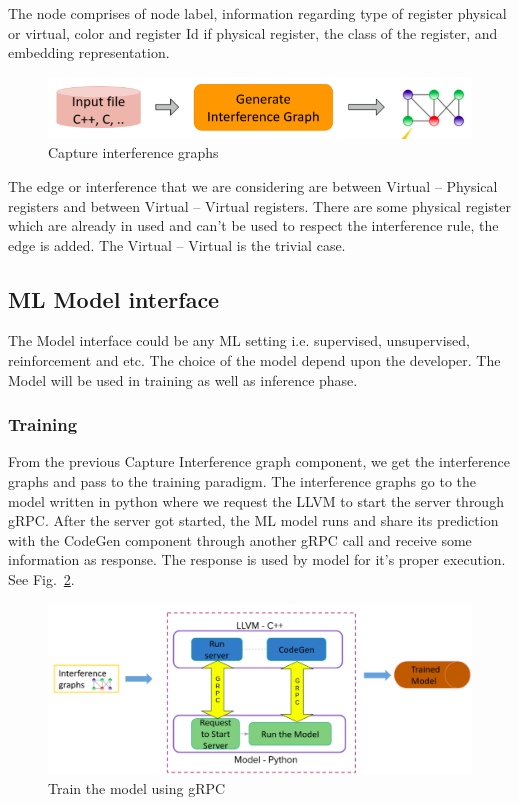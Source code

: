 The node comprises of node label, information regarding type of register physical or virtual, color and register Id if physical register, the class of the register, and embedding representation.

\begin{figure}[t]
    \centering
    \includegraphics[scale=0.4]{figures/chapter-5/mlra_cig.png}
    \caption{Capture interference graphs}
     \label{fig:mlra-cig}
\end{figure}

The edge or interference that we are considering are between Virtual -- Physical registers and between Virtual -- Virtual registers. There are some physical register which are already in used and can’t be used to respect the interference rule, the edge is added. The Virtual -- Virtual is the trivial case.
\subsection{ML Model interface}
The Model interface could be any ML setting i.e. supervised, unsupervised, reinforcement and etc. The choice of the model depend upon the developer. The Model will be used in training as well as inference phase.

\subsubsection{Training}
From the previous Capture Interference graph component, we get the interference graphs and pass to the training paradigm. The interference graphs go to the model written in python where we request the LLVM to start the server through gRPC. After the server got started, the ML model runs and share its prediction with the CodeGen component through another gRPC call and receive some information as response. The response is used by model for it's proper execution. See Fig.~\ref{fig:mlra-training}.

\begin{figure}[t]
    \centering
    \includegraphics[scale=0.4]{figures/chapter-5/mlra_training.png}
    \caption{Train the model using gRPC}
     \label{fig:mlra-training}
\end{figure}

